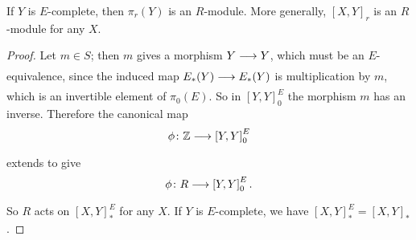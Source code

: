 \documentclass[../main]{subfiles}
\begin{document}
\begin{proposition} \label{prop:p3ch14.17}
If $Y$ is $E$-complete, then $\pi_{r}(Y)$ is an $R$-module. More generally, $\left[X,Y\right]_{r}$ is an $R$-module for any $X$.

\begin{proof} 
    Let $m \in  S$; then $m$ gives a morphism $Y \lar{} Y$, which must be an $E$-equivalence, since the induced map $E_{\ast}(Y) \lar{} E_{\ast}(Y)$ is multiplication by $m$, which is an invertible element of $\pi_{0}(E)$. So in $\left[Y,Y\right]^E_{0}$ the morphism $m$ has an inverse. Therefore the canonical map
     \[
      \phi\colon  \bZ \lar{}  \left[Y,Y\right]^E_{0} 
    \] 
    extends to give 
    \[
      \phi\colon  R \lar{}  \left[Y,Y\right]^E_{0} .
    \] 
So $R$ acts on $\left[X,Y\right]^E_{\ast}$ for any $X$. If $Y$ is $E$-complete, we have $\left[X,Y\right]^E_{\ast}=\left[X,Y\right]_{\ast}$.
\end{proof}
\end{proposition}
\end{document}
